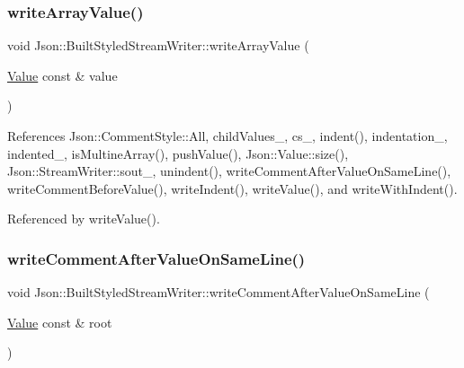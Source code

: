 \mbox{\label{structJson_1_1BuiltStyledStreamWriter_acd20e9274bbcf7876ef3af2e7d23a31f_acd20e9274bbcf7876ef3af2e7d23a31f}} 
\subsubsection{\texorpdfstring{write\+Array\+Value()}{writeArrayValue()}}
{\footnotesize\ttfamily void Json\+::\+Built\+Styled\+Stream\+Writer\+::write\+Array\+Value (\begin{DoxyParamCaption}\item[{\hyperlink{classJson_1_1Value}{Value} const \&}]{value }\end{DoxyParamCaption})\hspace{0.3cm}{\ttfamily [private]}}



References Json\+::\+Comment\+Style\+::\+All, child\+Values\+\_\+, cs\+\_\+, indent(), indentation\+\_\+, indented\+\_\+, is\+Multine\+Array(), push\+Value(), Json\+::\+Value\+::size(), Json\+::\+Stream\+Writer\+::sout\+\_\+, unindent(), write\+Comment\+After\+Value\+On\+Same\+Line(), write\+Comment\+Before\+Value(), write\+Indent(), write\+Value(), and write\+With\+Indent().



Referenced by write\+Value().

\mbox{\label{structJson_1_1BuiltStyledStreamWriter_a89625b134fce0255263ca40e6125742b_a89625b134fce0255263ca40e6125742b}} 
\subsubsection{\texorpdfstring{write\+Comment\+After\+Value\+On\+Same\+Line()}{writeCommentAfterValueOnSameLine()}}
{\footnotesize\ttfamily void Json\+::\+Built\+Styled\+Stream\+Writer\+::write\+Comment\+After\+Value\+On\+Same\+Line (\begin{DoxyParamCaption}\item[{\hyperlink{classJson_1_1Value}{Value} const \&}]{root }\end{DoxyParamCaption})\hspace{0.3cm}{\ttfamily [private]}}



